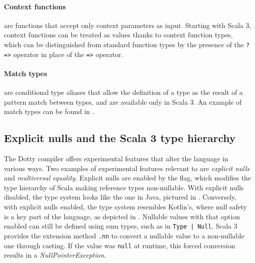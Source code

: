 \paragraph{Context functions} are functions that accept only context parameters as input.
%
Starting with Scala 3, context functions can be treated as values thanks to context function types, which can be distinguished from standard function types by the presence of the \texttt{?=>} operator in place of the \texttt{=>} operator.

\paragraph{Match types} are conditional type aliases that allow the definition of a type as the result of a pattern match between types, and are available only in Scala 3.
%
An example of match types can be found in .




\subsection{Explicit nulls and the Scala 3 type hierarchy} \label{chap:background->sec:scala3->subsec:type-hierarchy} \label{chap:background->sec:scala3->subsec:explicit-nulls}

The Dotty compiler offers experimental features that alter the language in various ways.
%
Two examples of experimental features relevant to \this are \textit{explicit nulls} and \textit{multiversal equality}.
%
Explicit nulls are enabled by the  flag, which modifies the type hierarchy of Scala making reference types non-nullable.
%
With explicit nulls disabled, the type system looks like the one in Java, pictured in .
%
Conversely, with explicit nulls enabled, the type system resembles Kotlin's, where null safety is a key part of the language, as depicted in .
%
Nullable values with that option enabled can still be defined using sum types, such as in \texttt{Type | Null}.
%
Scala 3 provides the extension method \texttt{.nn} to convert a nullable value to a non-nullable one through casting.
%
If the value was \texttt{null} at runtime, this forced conversion results in a \textit{NullPointerException}.

